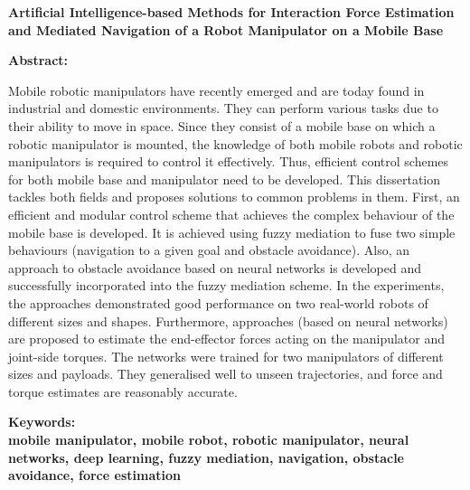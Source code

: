 

\newpage
\setlength{\parindent}{0in}
{\fontsize{14}{18}\bf {Artificial Intelligence-based Methods for Interaction Force Estimation and Mediated Navigation of a Robot Manipulator on a Mobile Base}}

\vskip 15mm
\textbf{Abstract:\\}	
	
\textnormal{Mobile robotic manipulators have recently emerged and are today found in industrial and domestic environments. They can perform various tasks due to their ability to move in space. Since they consist of a mobile base on which a robotic manipulator is mounted, the knowledge of both mobile robots and robotic manipulators is required to control it effectively. Thus, efficient control schemes for both mobile base and manipulator need to be developed. This dissertation tackles both fields and proposes solutions to common problems in them. First, an efficient and modular control scheme that achieves the complex behaviour of the mobile base is developed. It is achieved using fuzzy mediation to fuse two simple behaviours (navigation to a given goal and obstacle avoidance). Also, an approach to obstacle avoidance based on neural networks is developed and successfully incorporated into the fuzzy mediation scheme. In the experiments, the approaches demonstrated good performance on two real-world robots of different sizes and shapes.  Furthermore, approaches (based on neural networks) are proposed to estimate the end-effector forces acting on the manipulator and joint-side torques. The networks were trained for two manipulators of different sizes and payloads. They generalised well to unseen trajectories, and force and torque estimates are reasonably accurate.}
	
\vskip 15mm
\bf{Keywords:\\}
\textnormal{mobile manipulator, mobile robot, robotic manipulator, neural networks, deep learning, fuzzy mediation, navigation, obstacle avoidance, force estimation}
